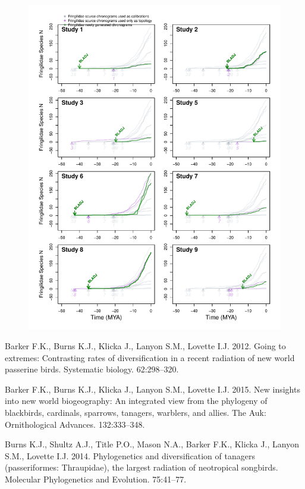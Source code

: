 \documentclass[]{article}
\begin{document}
\begin{figure}[!ht]
\includegraphics{fig_crossval_bladj.pdf}
\caption{}
\label{fig:cvbladj}
\end{figure}

\hypertarget{refs}{}
\leavevmode\hypertarget{ref-barker2012going}{}%
Barker F.K., Burns K.J., Klicka J., Lanyon S.M., Lovette I.J. 2012. Going to extremes: Contrasting rates of diversification in a recent radiation of new world passerine birds. Systematic biology. 62:298--320.

\leavevmode\hypertarget{ref-barker2015new}{}%
Barker F.K., Burns K.J., Klicka J., Lanyon S.M., Lovette I.J. 2015. New insights into new world biogeography: An integrated view from the phylogeny of blackbirds, cardinals, sparrows, tanagers, warblers, and allies. The Auk: Ornithological Advances. 132:333--348.

\leavevmode\hypertarget{ref-burns2014phylogenetics}{}%
Burns K.J., Shultz A.J., Title P.O., Mason N.A., Barker F.K., Klicka J., Lanyon S.M., Lovette I.J. 2014. Phylogenetics and diversification of tanagers (passeriformes: Thraupidae), the largest radiation of neotropical songbirds. Molecular Phylogenetics and Evolution. 75:41--77.
\end{document}

